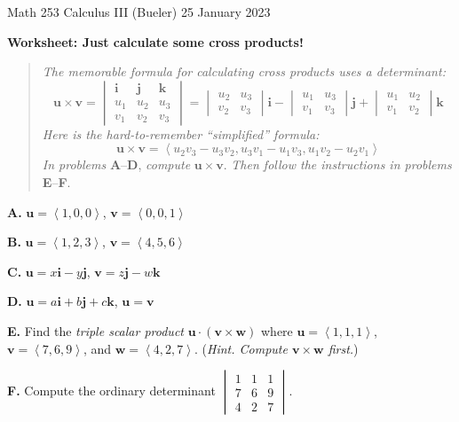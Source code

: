 \documentclass[11pt]{amsart}
\newcommand{\bi}{\mathbf{i}}
\newcommand{\bj}{\mathbf{j}}
\newcommand{\bk}{\mathbf{k}}
\newcommand{\bu}{\mathbf{u}}
\newcommand{\bv}{\mathbf{v}}
\newcommand{\bw}{\mathbf{w}}
\newcommand{\prob}[1]{\bigskip\noindent\textbf{#1.}\quad }
\begin{document}
\scriptsize \noindent Math 253 Calculus III (Bueler) \hfill 25 January 2023 
\normalsize\medskip

\Large\centerline{\textbf{Worksheet: Just calculate some cross products!}}
\medskip
\normalsize

\thispagestyle{empty}
\begin{quote}
\emph{The memorable formula for calculating cross products uses a determinant:}
  $$\bu \times \bv = \begin{vmatrix} \bi & \bj & \bk \\ u_1 & u_2 & u_3 \\ v_1 & v_2 & v_3 \end{vmatrix} = \begin{vmatrix} u_2 & u_3 \\ v_2 & v_3 \end{vmatrix} \bi - \begin{vmatrix} u_1 & u_3 \\ v_1 & v_3 \end{vmatrix} \bj + \begin{vmatrix} u_1 & u_2 \\ v_1 & v_2 \end{vmatrix} \bk$$
\emph{Here is the hard-to-remember ``simplified'' formula:}
  $$\bu \times \bv = \left<u_2 v_3 - u_3 v_2, u_3 v_1 - u_1 v_3, u_1 v_2 - u_2 v_1\right>$$
\emph{In problems} \textbf{A}--\textbf{D}, \emph{compute} $\bu \times \bv$.  \emph{Then follow the instructions in problems} \textbf{E}--\textbf{F}.
\end{quote}
\bigskip

\prob{A}  $\bu=\left<1,0,0\right>$, $\bv=\left<0,0,1\right>$
\vfill

\prob{B}  $\bu=\left<1,2,3\right>$, $\bv=\left<4,5,6\right>$
\vfill

\prob{C}  $\bu=x\bi - y\bj$, $\bv = z\bj - w\bk$
\vfill

\prob{D}  $\bu=a\bi + b\bj + c\bk$, $\bu=\bv$
\vfill

\clearpage\newpage
\prob{E}  Find the \emph{triple scalar product} $\bu\cdot (\bv\times\bw)$ where $\bu=\left<1,1,1\right>$, $\bv=\left<7,6,9\right>$, and $\bw=\left<4,2,7\right>$.  (\emph{Hint.  Compute $\bv\times \bw$ first.})
\vfill

\prob{F}  Compute the ordinary determinant $\displaystyle \begin{vmatrix} 1 & 1 & 1 \\ 7 & 6 & 9 \\ 4 & 2 & 7 \end{vmatrix}$.
\vspace{6.0in}
\end{document}
